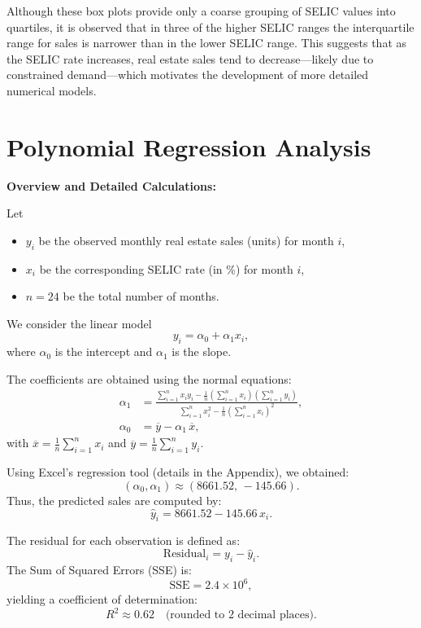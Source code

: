 \documentclass[10pt]{article}
\begin{document}
Although these box plots provide only a coarse grouping of SELIC values into quartiles, it is observed that in three of the higher SELIC ranges the interquartile range for sales is narrower than in the lower SELIC range. This suggests that as the SELIC rate increases, real estate sales tend to decrease—likely due to constrained demand—which motivates the development of more detailed numerical models.

\section{Polynomial Regression Analysis}
\label{sec:poly}

\textbf{Overview and Detailed Calculations:}

Let 
\begin{itemize}
    \item \(y_i\) be the observed monthly real estate sales (units) for month \(i\),
    \item \(x_i\) be the corresponding SELIC rate (in \%) for month \(i\),
    \item \(n=24\) be the total number of months.
\end{itemize}

We consider the linear model
\[
y_i = \alpha_0 + \alpha_1 x_i,
\]
where \(\alpha_0\) is the intercept and \(\alpha_1\) is the slope.

The coefficients are obtained using the normal equations:
\begin{align}
\alpha_1 &= \frac{\sum_{i=1}^{n} x_i y_i - \frac{1}{n}\left(\sum_{i=1}^{n} x_i\right)\left(\sum_{i=1}^{n} y_i\right)}
             {\sum_{i=1}^{n} x_i^2 - \frac{1}{n}\left(\sum_{i=1}^{n} x_i\right)^2}, \label{eq:alpha1}\\[2mm]
\alpha_0 &= \overline{y} - \alpha_1\,\overline{x}, \label{eq:alpha0}
\end{align}
with \(\overline{x}=\frac{1}{n}\sum_{i=1}^{n}x_i\) and \(\overline{y}=\frac{1}{n}\sum_{i=1}^{n}y_i\).

Using Excel's regression tool (details in the Appendix), we obtained:
\[
(\alpha_0,\alpha_1) \approx (8661.52,\,-145.66).
\]
Thus, the predicted sales are computed by:
\[
\hat{y}_i = 8661.52 - 145.66\, x_i.
\]

The residual for each observation is defined as:
\[
\text{Residual}_i = y_i - \hat{y}_i.
\]
The Sum of Squared Errors (SSE) is:
\[
\text{SSE}= 2.4 \times 10^6,
\]
yielding a coefficient of determination:
\[
R^2 \approx 0.62 \quad \text{(rounded to 2 decimal places)}.
\]
\end{document}
